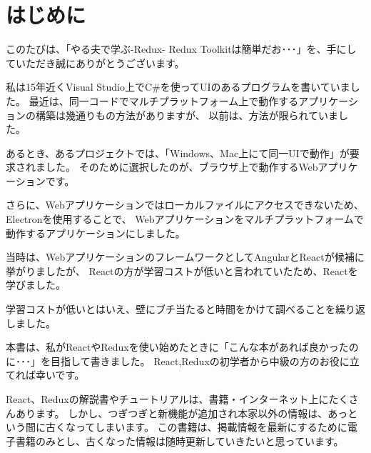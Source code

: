 \chapter{はじめに}
\label{chap:00-preface}

このたびは、「やる夫で学ぶ{-}Redux{-} Redux Toolkitは簡単だお･･･」を、手にしていただき誠にありがとうございます。

\vspace*{\baselineskip}
\vspace*{\baselineskip}

私は15年近くVisual Studio上でC\#を使ってUIのあるプログラムを書いていました。
最近は、同一コードでマルチプラットフォーム上で動作するアプリケーションの構築は幾通りもの方法がありますが、
以前は、方法が限られていました。

\vspace*{\baselineskip}

あるとき、あるプロジェクトでは、「Windows、Mac上にて同一UIで動作」が要求されました。
そのために選択したのが、ブラウザ上で動作するWebアプリケーションです。

\vspace*{\baselineskip}

さらに、Webアプリケーションではローカルファイルにアクセスできないため、Electronを使用することで、
Webアプリケーションをマルチプラットフォームで動作するアプリケーションにしました。

\vspace*{\baselineskip}

当時は、WebアプリケーションのフレームワークとしてAngularとReactが候補に挙がりましたが、
Reactの方が学習コストが低いと言われていたため、Reactを学びました。

学習コストが低いとはいえ、壁にブチ当たると時間をかけて調べることを繰り返しました。

\vspace*{\baselineskip}

本書は、私がReactやReduxを使い始めたときに「こんな本があれば良かったのに･･･」を目指して書きました。
React,Reduxの初学者から中級の方のお役に立てれば幸いです。

\vspace*{\baselineskip}

React、Reduxの解説書やチュートリアルは、書籍・インターネット上にたくさんあります。
しかし、つぎつぎと新機能が追加され本家以外の情報は、あっという間に古くなってしまいます。
この書籍は、掲載情報を最新にするために電子書籍のみとし、古くなった情報は随時更新していきたいと思っています。

